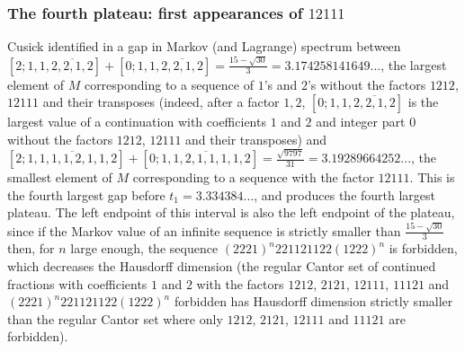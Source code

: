 \documentclass[10pt]{amsart}
\numberwithin{equation}{section}
\theoremstyle{definition}
\begin{document}
\subsubsection{The fourth plateau: first appearances of $12111$} 

Cusick identified in \cite{C74} a gap in Markov (and Lagrange) spectrum between $[2;1,1,\overline{2,2,1,2}]+[0;1,1, \overline{2,2,1,2}]=\frac{15-\sqrt{30}}{3}=3.174258141649...$, the largest element of $M$ corresponding to a sequence of $1$'s and $2$'s without the factors $1212$, $12111$ and their transposes (indeed, after a factor $1,2$, $[0;1,1,\overline{2,2,1,2}]$ is the largest value of a continuation with coefficients $1$ and $2$ and integer part $0$ without the factors $1212$, $12111$ and their transposes) and $[2; \overline{1,1,1,1,2,1,1,2}]+[0;\overline{1,1,2,1,1,1,1,2}]=\frac{\sqrt{9797}}{31}=3.19289664252...$, the smallest element of $M$ corresponding to a sequence with the factor $12111$. This is the fourth largest gap before $t_1=3.334384...$, and produces the fourth largest plateau. The left endpoint of this interval is also the left endpoint of the plateau, since if the Markov value of an infinite sequence is strictly smaller than $\frac{15-\sqrt{30}}{3}$ then, for $n$ large enough, the sequence $(2221)^n 221121122(1222)^n$ is forbidden, which decreases the Hausdorff dimension (the regular Cantor set of continued fractions with coefficients $1$ and $2$ with the factors $1212$, $2121$, $12111$, $11121$ and $(2221)^n 221121122(1222)^n$ forbidden has Hausdorff dimension strictly smaller than the regular Cantor set where only $1212$, $2121$, $12111$ and $11121$ are forbidden). 
\end{document}

